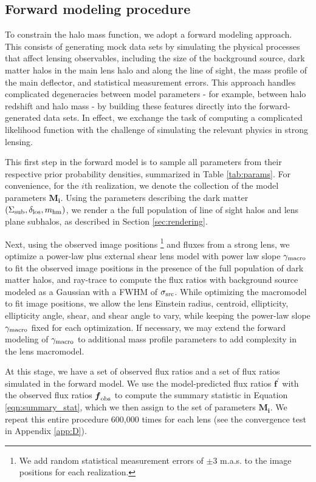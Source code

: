 \subsection{Forward modeling procedure}
\label{ssec:forwardmodeling}

To constrain the halo mass function, we adopt a forward modeling approach. This consists of generating mock data sets by simulating the physical processes that affect lensing observables, including the size of the background source, dark matter halos in the main lens halo and along the line of sight, the mass profile of the main deflector, and statistical measurement errors. This approach handles complicated degeneracies between model parameters - for example, between halo redshift and halo mass \cite{Despali++18} - by building these features directly into the forward-generated data sets. In effect, we exchange the task of computing a complicated likelihood function with the challenge of simulating the relevant physics in strong lensing.

This first step in the forward model is to sample all parameters from their respective prior probability densities, summarized in Table \ref{tab:params}. For convenience, for the $i$th realization, we denote the collection of the model parameters $\boldsymbol{M_i}$. Using the parameters describing the dark matter $\left(\Sigma_{\rm{sub}}, \delta_{\rm{los}}, {m_{\rm{hm}}} \right)$, we render a the full population of line of sight halos and lens plane subhalos, as described in Section \ref{sec:rendering}. 

Next, using the observed image positions \footnote{We add random statistical measurement errors of $\pm 3$ m.a.s. to the image positions for each realization.} and fluxes from a strong lens, we optimize a power-law plus external shear lens model with power law slope $\gamma_{\rm{macro}}$ to fit the observed image positions in the presence of the full population of dark matter halos, and ray-trace to compute the flux ratios with background source modeled as a Gaussian with a FWHM of $\sigma_{\rm{src}}$. While optimizing the macromodel to fit image positions, we allow the lens Einstein radius, centroid, ellipticity, ellipticity angle, shear, and shear angle to vary, while keeping the power-law slope $\gamma_{\rm{macro}}$ fixed for each optimization. If necessary, we may extend the forward modeling of $\gamma_{\rm{macro}}$ to additional mass profile parameters to add complexity in the lens macromodel. 

At this stage, we have a set of observed flux ratios and a set of flux ratios simulated in the forward model. We use the model-predicted flux ratios $\boldsymbol{f^{\prime}}$ with the observed flux ratios $\boldsymbol{f}_{\rm{obs}}$ to compute the summary statistic in Equation \ref{eqn:summary_stat}, which we then assign to the set of parameters $\boldsymbol{M_i}$. We repeat this entire procedure 600,000 times for each lens (see the convergence test in Appendix \ref{app:D}). 

